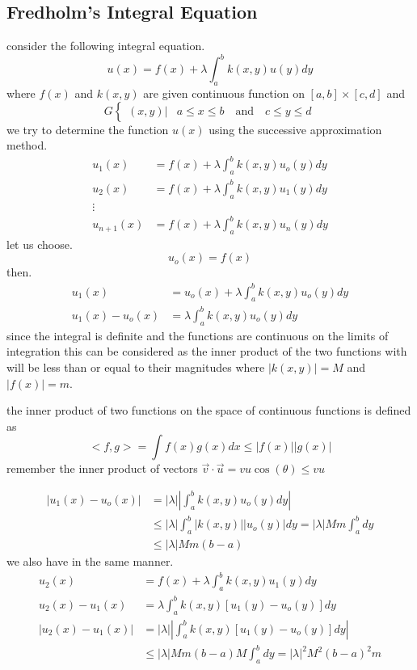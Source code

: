\documentclass[]{article}
\begin{document}
\subsection{Fredholm's Integral Equation}
consider the following integral equation.
\[
u(x) = f(x) + \lambda\int_{a}^{b} k(x,y) u(y)dy    
\]
where $f(x)$ and $k(x,y)$ are given continuous function on $[a,b]\times[c,d]$ and
\[
    G 
    \begin{cases}
    (x,y) |&     a\leq x\leq b \quad \text{and} \quad c\leq y\leq d
    \end{cases}
\]
we try to determine the function $u(x)$ using the successive approximation method.
\begin{align*}
u_1(x) &= f(x) + \lambda\int_{a}^{b} k(x,y) u_o(y)dy
\\
u_2(x) &= f(x) + \lambda\int_{a}^{b} k(x,y) u_1(y)dy
\\
\vdots
\\
u_{n+1}(x) &= f(x) + \lambda\int_{a}^{b} k(x,y) u_n(y)dy
\end{align*}
let us choose.
\[
u_o(x) = f(x)    
\]
then.
\begin{align*}
u_1(x) &= u_o(x) + \lambda\int_{a}^{b} k(x,y) u_o(y)dy
\\
u_1(x)- u_o(x) &= \lambda\int_{a}^{b} k(x,y) u_o(y)dy
\end{align*}
since the integral is definite and the functions are continuous on the limits of integration 
this can be considered as the inner product of the two functions 
with will be less than or equal to their magnitudes where $|k(x,y)| = M$ and $|f(x)| = m$.
\begin{enrichment*}{}
    the inner product of two functions on the space of continuous functions is defined as 
    \[
        <f,g> = \int f(x)g(x)dx \leq |f(x)||g(x)|
    \]
     remember the inner product of vectors $\vec{v}\cdot \vec{u} = vu \cos(\theta) \leq vu$
\end{enrichment*}
\begin{align*}
    \left|u_1(x)- u_o(x)\right| &= |\lambda|\left|\int_{a}^{b} k(x,y) u_o(y)dy\right|    
    \\
    & \leq |\lambda|\int_{a}^{b}|k(x,y)||u_o(y)|dy = |\lambda|Mm\int_{a}^{b}dy
    \\
    & \leq |\lambda|Mm(b-a)
\end{align*}
we also have in the same manner. 
\begin{align*}
u_2(x) &= f(x) + \lambda\int_{a}^{b} k(x,y) u_1(y)dy
\\
u_2(x) - u_1(x)&= \lambda\int_{a}^{b} k(x,y) [u_1(y)-u_o(y)]dy
\\
|u_2(x) - u_1(x)| &= |\lambda|\left|\int_{a}^{b} k(x,y) [u_1(y)-u_o(y)]dy\right| 
\\
&\leq |\lambda|Mm(b-a) M \int_{a}^{b}dy = |\lambda|^2M^2{(b-a)}^2 m
\end{align*}
\end{document}
